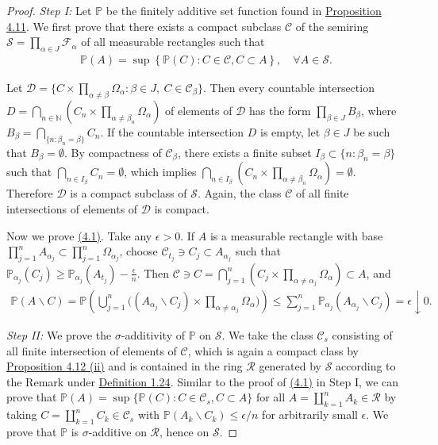\documentclass{article}
\numberwithin{equation}{section}
\renewcommand{\P}{\mathbb{P}}
\theoremstyle{plain}
\theoremstyle{definition}
\begin{document}
\begin{proof}
\textit{Step I:} Let $\P$ be the finitely additive set function found in \hyperref[prop:4.11]{Proposition 4.11}. We first prove that there exists a compact subclass $\mathscr{C}$ of the semiring $\mathscr{S}=\prod_{\alpha\in J}\mathscr{F}_\alpha$ of all measurable rectangles such that
\begin{align*}
	\P(A)=\sup\left\{\P(C):C\in\mathscr{C},C\subset A\right\},\quad \forall A\in\mathscr{S}.\tag{4.1}\label{eq:4.1}
\end{align*}

Let $\mathscr{D}=\{C\times\prod_{\alpha\neq\beta}\Omega_\alpha:\beta\in J,\ C\in\mathscr{C}_\beta\}$. Then every countable intersection $D=\bigcap_{n\in\mathbb{N}}(C_n\times\prod_{\alpha\neq\beta_n}\Omega_\alpha)$ of elements of $\mathscr{D}$ has the form $\prod_{\beta\in J}B_\beta$, where $B_\beta=\bigcap_{\{n:\beta_n=\beta\}}C_n$. If the countable intersection $D$ is empty, let $\beta\in J$ be such that $B_\beta=\emptyset$. By compactness of $\mathscr{C}_\beta$, there exists a finite subset $I_\beta\subset\{n:\beta_n=\beta\}$ such that $\bigcap_{n\in I_\beta}C_n=\emptyset$, which implies $\bigcap_{n\in I_\beta}(C_n\times\prod_{\alpha\neq\beta_n}\Omega_\alpha)=\emptyset$. Therefore $\mathscr{D}$ is a compact subclass of $\mathscr{S}$. Again, the class $\mathscr{C}$ of all finite intersections of elements of $\mathscr{D}$ is compact.

Now we prove \hyperref[eq:4.1]{(4.1)}. Take any $\epsilon>0$. If $A$ is a measurable rectangle with base $\prod_{j=1}^n A_{\alpha_j}\subset\prod_{j=1}^n \Omega_{\alpha_j}$, choose $\mathscr{C}_{t_j}\ni C_j\subset A_{\alpha_j}$ such that $\P_{\alpha_j}(C_j)\geq\P_{\alpha_j}(A_{t_j})-\frac{\epsilon}{n}$. Then $\mathscr{C}\ni C=\bigcap_{j=1}^n(C_j\times\prod_{\alpha\neq\alpha_j}\Omega_{\alpha})\subset A$, and 
\begin{align*}
	\P(A\backslash C)=\P\left(\bigcup_{j=1}^n \biggl((A_{\alpha_j}\backslash C_j)\times\prod_{\alpha\neq\alpha_j}\Omega_\alpha\biggr)\right)\leq\sum_{j=1}^n\P_{\alpha_j}(A_{\alpha_j}\backslash C_j) = \epsilon\downarrow 0.
\end{align*}

\textit{Step II:} We prove the $\sigma$-additivity of $\P$ on $\mathscr{S}$. We take the class $\mathscr{C}_s$ consisting of all finite intersection of elements of $\mathscr{C}$, which is again a compact class by \hyperref[prop:4.12]{Proposition 4.12 (ii)} and is contained in the ring $\mathscr{R}$ generated by $\mathscr{S}$ according to the Remark under \hyperref[def:1.24]{Definition 1.24}. Similar to the proof of \hyperref[eq:4.1]{(4.1)} in Step I, we can prove that $\P(A)=\sup\{\P(C):C\in\mathscr{C}_s,C\subset A\}$ for all $A=\coprod_{k=1}^n A_k\in\mathscr{R}$ by taking $C=\coprod_{k=1}^n C_k\in\mathscr{C}_s$ with $\P(A_k\backslash C_k)\leq\epsilon/n$ for arbitrarily small $\epsilon$. We prove that $\P$ is $\sigma$-additive on $\mathscr{R}$, hence on $\mathscr{S}$.


\end{proof}
\end{document}
